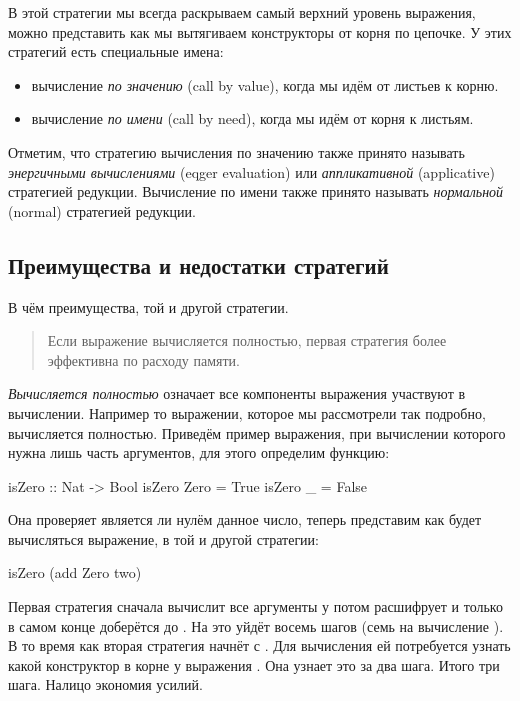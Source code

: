 В этой стратегии мы всегда раскрываем самый верхний уровень
выражения, можно представить как мы вытягиваем конструкторы
от корня по цепочке. У этих стратегий есть специальные имена:

\begin{itemize}
\item вычисление \emph{по значению} (call by value), когда 
    мы идём от листьев к корню.

\item вычисление \emph{по имени} (call by need), когда
    мы идём от корня к листьям.
\end{itemize}

Отметим, что стратегию вычисления по значению также принято
называть \emph{энергичными вычислениями} (eqger evaluation)
или \emph{аппликативной} (applicative) стратегией редукции. 
Вычисление по имени также принято называть
\emph{нормальной} (normal) стратегией редукции.

\subsection{Преимущества и недостатки стратегий}

В чём преимущества, той и другой стратегии. 

\begin{quote}
Если выражение вычисляется полностью, первая стратегия
более эффективна по расходу памяти.
\end{quote}

\emph{Вычисляется полностью} означает все компоненты
выражения участвуют в вычислении. Например то выражении,
которое мы рассмотрели так подробно, вычисляется полностью.
Приведём пример выражения, при вычислении которого нужна лишь
часть аргументов, для этого определим функцию: 

\begin{code}
isZero :: Nat -> Bool
isZero Zero     = True
isZero _        = False
\end{code}

Она проверяет является ли нулём данное число, теперь представим
как будет вычисляться выражение, в той и другой стратегии:

\begin{code}
isZero (add Zero two)
\end{code}

Первая стратегия сначала вычислит все аргументы у 
потом расшифрует  и только в самом конце доберётся 
до . На это уйдёт восемь шагов (семь 
на вычисление ).
В то время как вторая стратегия начнёт с . 
Для вычисления  ей потребуется узнать какой конструктор в корне у
выражения . Она узнает это за два шага. 
Итого три шага. Налицо экономия усилий. 

